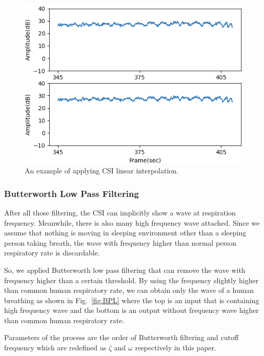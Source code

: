 \documentclass[10pt,letterpaper]{article}
\begin{document}
	\begin{figure}[htbp]
		\centerline{\includegraphics[width=120mm,scale=0.9]{FILPD_G2L.png}}
		\caption{An example of applying CSI linear interpolation.}
		\label{fig:LINEARINTER}
	\end{figure}
	
	

		\subsubsection*{Butterworth Low Pass Filtering}
			
			 After all those filtering, the CSI can implicitly show a wave at respiration frequency. Meanwhile, there is also many high frequency wave attached. Since we assume that nothing is moving in sleeping environment other than a sleeping person taking breath, the wave with frequency higher than normal person respiratory rate is discardable.
			 
			 So, we applied Butterworth low pass filtering that can remove the wave with frequency higher than a certain threshold. By using the  frequency slightly higher than common human respiratory rate, we can obtain only the wave of a human breathing as shown in Fig.~\ref{fig:BPL} where the top is an input that is containing high frequency wave and the bottom is an output without frequency wave higher than common human respiratory rate.
			 
			 Parameters of the process are the order of Butterworth filtering and cutoff frequency which are redefined as $\zeta$ and $\omega$ respectively in this paper.
			
			
			
\end{document}
